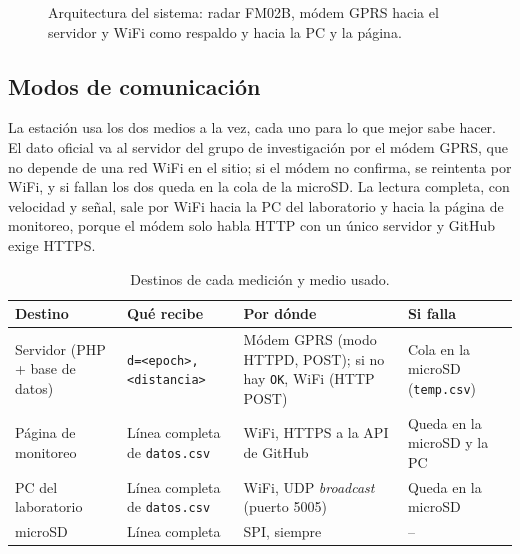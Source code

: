 \documentclass[11pt,a4paper]{article}
\begin{document}
\begin{figure}[H]
    \centering
    \resizebox{\textwidth}{!}{}
    \caption{Arquitectura del sistema: radar FM02B, módem GPRS hacia el servidor y WiFi como respaldo y hacia la PC y la página.}
\end{figure}

\subsection{Modos de comunicación}
\label{sec:modos}

La estación usa los dos medios a la vez, cada uno para lo que mejor sabe
hacer. El dato oficial va al servidor del grupo de investigación por el
módem GPRS, que no depende de una red WiFi en el sitio; si el módem no
confirma, se reintenta por WiFi, y si fallan los dos queda en la cola
de la microSD. La lectura completa, con velocidad y señal, sale por WiFi hacia
la PC del laboratorio y hacia la página de monitoreo, porque el módem solo
habla HTTP con un único servidor y GitHub exige HTTPS.

\begin{table}[H]
    \centering
    \small
    \caption{Destinos de cada medición y medio usado.}
    \begin{tabularx}{\textwidth}{>{\raggedright\arraybackslash}p{2.9cm}>{\raggedright\arraybackslash}p{3.2cm}L>{\raggedright\arraybackslash}p{2.3cm}}
        \toprule
        \textbf{Destino} & \textbf{Qué recibe} & \textbf{Por dónde} & \textbf{Si falla} \\
        \midrule
        Servidor (PHP + base de datos) & \texttt{d=<epoch>,}\newline\texttt{<distancia>} &
            Módem GPRS (modo HTTPD, POST); si no hay \texttt{OK},
            WiFi (HTTP POST) & Cola en la microSD (\texttt{temp.csv}) \\
        Página de monitoreo & Línea completa de \texttt{datos.csv} & WiFi,
            HTTPS a la API de GitHub & Queda en la microSD y la PC \\
        PC del laboratorio & Línea completa de \texttt{datos.csv} & WiFi, UDP
            \emph{broadcast} (puerto 5005) & Queda en la microSD \\
        microSD & Línea completa & SPI, siempre & -- \\
        \bottomrule
    \end{tabularx}
\end{table}
\end{document}
